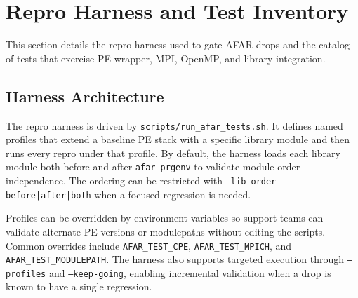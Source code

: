 \section{Repro Harness and Test Inventory}
\label{sec:harness}
This section details the repro harness used to gate AFAR drops and the catalog
of tests that exercise PE wrapper, MPI, OpenMP, and library integration.

\subsection{Harness Architecture}
\label{sec:harness-arch}
The repro harness is driven by \texttt{scripts/run\_afar\_tests.sh}. It defines
named profiles that extend a baseline PE stack with a specific library module
and then runs every repro under that profile. By default, the harness loads
each library module both before and after \texttt{afar-prgenv} to validate
module-order independence. The ordering can be restricted with
\texttt{--lib-order before|after|both} when a focused regression is needed.

Profiles can be overridden by environment variables so support teams can
validate alternate PE versions or modulepaths without editing the scripts.
Common overrides include \texttt{AFAR\_TEST\_CPE}, \texttt{AFAR\_TEST\_MPICH},
and \texttt{AFAR\_TEST\_MODULEPATH}. The harness also supports targeted
execution through \texttt{--profiles} and \texttt{--keep-going}, enabling
incremental validation when a drop is known to have a single regression.

